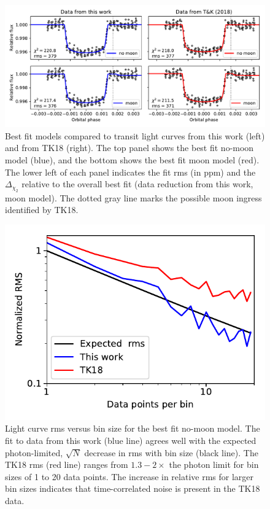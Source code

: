 \documentclass[twocolumn]{aastex62}
\begin{document}
\begin{figure}
\includegraphics[width = 1.0 \textwidth]{figures/fig3_bestfits.pdf}
    \caption{Best fit models compared to transit light curves from this work (left) and from TK18 (right). The top panel shows the best fit no-moon model (blue), and the bottom shows the best fit moon model (red). The lower left of each panel indicates the fit rms (in ppm) and the $\Delta_{\chi_2}$ relative to the overall best fit (data reduction from this work, moon model). The dotted gray line marks the possible moon ingress identified by TK18.}
\label{fig:bestfit}
\end{figure}

\begin{figure}
\includegraphics[width = 0.5 \textwidth]{figures/fig2_rms.pdf}
    \caption{Light curve rms versus bin size for the best fit no-moon model. The fit to data from this work (blue line) agrees well with the expected photon-limited, $\sqrt{N}$ decrease in rms with bin size (black line). The TK18 rms (red line) ranges from $1.3 - 2\times$ the photon limit for bin sizes of 1 to 20 data points. The increase in relative rms for larger bin sizes indicates that time-correlated noise is present in the TK18 data.}
\label{fig:rms}
\end{figure}
\end{document}

